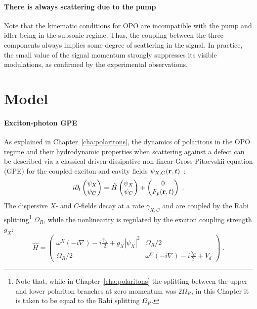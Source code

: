 \paragraph{There is always scattering due to the pump}
Note that the kinematic conditions for OPO are incompatible with the
pump and idler being in the subsonic regime. Thus, the coupling
between the three components always implies some degree of scattering
in the signal. In practice, the small value of the signal momentum
strongly suppresses its visible modulations, as confirmed by the
experimental observations.

\section{Model}
\label{sec:model-opo}

\paragraph{Exciton-photon GPE}
As explained in Chapter~\ref{cha:polaritons}, the dynamics of
polaritons in the OPO regime and their hydrodynamic properties when
scattering against a defect can be described via a classical
driven-dissipative non-linear Gross-Pitaevskii equation (GPE) for the
coupled exciton and cavity fields
$\psi_{X,C} (\mathbf{r},t)$~\cite{Whittaker_2005,Carusotto_2013}:
%
\begin{equation}
  i\partial_t \begin{pmatrix} \psi_X \\ \psi_C \end{pmatrix} =
  \hat{H} \begin{pmatrix} \psi_X \\ \psi_C \end{pmatrix}
  + \begin{pmatrix} 0 \\ F_p(\mathbf{r},t) \end{pmatrix} \; .
\label{eq:gpequ}
\end{equation}
%
The dispersive $X$- and $C$-fields decay at a rate $\gamma_{X,C}$ and
are coupled by the Rabi splitting\footnote{Note that, while in
  Chapter~\ref{cha:polaritons} the splitting between the upper and
  lower polariton branches at zero momentum was $2\Omega_R$, in this
  Chapter it is taken to be equal to the Rabi splitting $\Omega_R$.}
$\Omega_R$, while the nonlinearity is regulated by the exciton
coupling strength $g_X$:
%
\begin{equation}
  \hat{H} = \begin{pmatrix} \omega^{X}(-i\nabla) - i
    \frac{\gamma_X}{2} + g_X |\psi_X|^2 & \Omega_R/2 \\ \Omega_R/2 &
    \omega^C(-i\nabla) - i \frac{\gamma_C}{2} + V_d \end{pmatrix} \;
  .
\end{equation}
